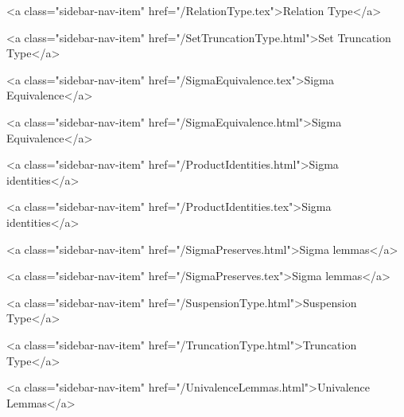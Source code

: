       
    
      
        
          <a class="sidebar-nav-item" href="/RelationType.tex">Relation Type</a>
        
      
    
      
        
          <a class="sidebar-nav-item" href="/SetTruncationType.html">Set Truncation Type</a>
        
      
    
      
        
          <a class="sidebar-nav-item" href="/SigmaEquivalence.tex">Sigma Equivalence</a>
        
      
    
      
        
          <a class="sidebar-nav-item" href="/SigmaEquivalence.html">Sigma Equivalence</a>
        
      
    
      
        
          <a class="sidebar-nav-item" href="/ProductIdentities.html">Sigma identities</a>
        
      
    
      
        
          <a class="sidebar-nav-item" href="/ProductIdentities.tex">Sigma identities</a>
        
      
    
      
        
          <a class="sidebar-nav-item" href="/SigmaPreserves.html">Sigma lemmas</a>
        
      
    
      
        
          <a class="sidebar-nav-item" href="/SigmaPreserves.tex">Sigma lemmas</a>
        
      
    
      
        
          <a class="sidebar-nav-item" href="/SuspensionType.html">Suspension Type</a>
        
      
    
      
        
          <a class="sidebar-nav-item" href="/TruncationType.html">Truncation Type</a>
        
      
    
      
        
          <a class="sidebar-nav-item" href="/UnivalenceLemmas.html">Univalence Lemmas</a>
        
